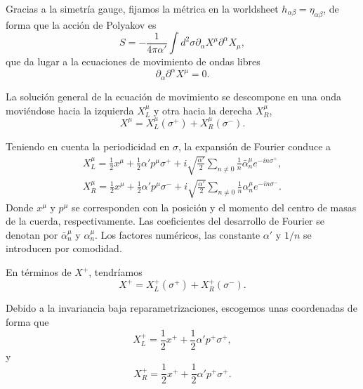 Gracias a la simetría gauge, fijamos la métrica en la worldsheet $h_{\alpha\beta}=\eta_{\alpha\beta}$, de forma que 
la acción de Polyakov es
\begin{equation}
  S = -\frac{1}{4\pi\alpha'} \int d^2\sigma \partial_\alpha X^\mu \partial^\alpha X_\mu,
\end{equation}
que da lugar a la ecuaciones de movimiento de ondas libres
\begin{equation}
  \partial_\alpha \partial^\alpha X^\mu=0.
\end{equation}

La solución general de la ecuación de movimiento se descompone
en una onda moviéndose hacia la izquierda $X^\mu_L$ y otra hacia la derecha $X^\mu_R$,
\begin{equation}
   X^\mu =X^\mu_L(\sigma^+) + X^\mu_R(\sigma^-).
\end{equation}

Teniendo en cuenta la periodicidad en $\sigma$, la expansión de Fourier conduce a
\begin{equation}
  \begin{gathered}
    X^\mu_L=\frac 1 2 x^\mu + \frac 1 2 \alpha' p^\mu \sigma^+ + i\sqrt{\frac{\alpha'}{2}}\sum_{n\neq 0} \frac{1}{n}\bar \alpha^\mu_n e^{-in\sigma^+},\\
    X^\mu_R=\frac 1 2 x^\mu + \frac 1 2 \alpha' p^\mu \sigma^- +i\sqrt{\frac{\alpha'}{2}}\sum_{n\neq 0} \frac{1}{n}\alpha^\mu_n e^{-in\sigma^-}.
  \end{gathered}
\end{equation}
Donde $x^\mu$ y $p^\mu$ se corresponden con la posición y el momento del centro de masas de la cuerda, respectivamente. 
Las coeficientes del desarrollo de Fourier se denotan por $\bar \alpha^\mu_n$ y $\alpha^\mu_n$.
Los factores numéricos, las constante $\alpha'$ y $1/n$ se introducen por comodidad.

En términos de $X^+$, tendríamos
\begin{equation}
   X^+ =X^+_L(\sigma^+) + X^+_R(\sigma^-).
\end{equation}

Debido a la invariancia baja reparametrizaciones, escogemos unas coordenadas de forma que
\begin{equation}
  X^+_L=\frac 1 2 x^+ + \frac 1 2 \alpha' p^+ \sigma^+,
\end{equation}
y
\begin{equation}
  X^+_R=\frac 1 2 x^+ + \frac 1 2 \alpha' p^+ \sigma^+.
\end{equation}


